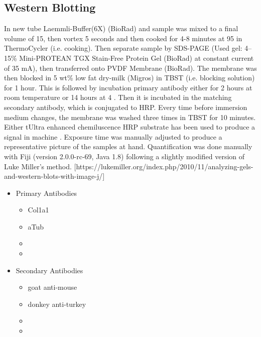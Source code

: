 \subsection{Western Blotting}
In new tube Laemmli-Buffer(6X) (BioRad) and sample was mixed to a final volume of 15\mul{}, then  vortex 5 seconds and then cooked for 4-8 minutes at 95 \degC in ThermoCycler (i.e. cooking). Then separate sample by SDS-PAGE (Used gel: 4–15\% Mini-PROTEAN TGX Stain-Free Protein Gel (BioRad) at constant current of 35 mA), then transferred onto PVDF Membrane (BioRad). The membrane was then blocked in 5 wt\% low fat dry-milk (Migros) in TBST (i.e. blocking solution) for 1 hour. This is followed by incubation primary antibody either for 2 hours at room temperature or 14 hours at 4 \degC{}. Then it is incubated in the matching secondary antibody, which is conjugated to HRP. Every time before immersion medium changes, the membrane was washed three times in TBST for 10 minutes. Either tUltra enhanced chemiluscence HRP substrate  has been used to produce a signal in machine . Exposure time was manually adjusted to produce a representative picture of the samples at hand. Quantification was done manually with Fiji (version 2.0.0-rc-69, Java 1.8) following a slightly modified version of Luke Miller's method. [https://lukemiller.org/index.php/2010/11/analyzing-gels-and-western-blots-with-image-j/]

\begin{itemize}
    \item Primary Antibodies
    \begin{itemize}
        \item Col1a1
        \item aTub
        \item 
        \item 
    \end{itemize}
        \item Secondary Antibodies
    \begin{itemize}
        \item goat anti-mouse
        \item donkey anti-turkey
        \item 
        \item 
    \end{itemize}
\end{itemize}


